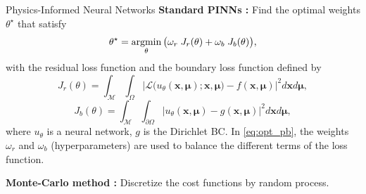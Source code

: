 \begin{frame}{Physics-Informed Neural Networks}
	\textbf{Standard PINNs :} Find the optimal weights $\theta^\star$ that satisfy
	\begin{equation}
		\label{eq:opt_pb}
		\theta^\star = \operatorname*{argmin}_{\theta}	\big( \omega_r \; J_r(\theta) + \omega_b \; J_b(\theta) \big),
	\end{equation}
	with the residual loss function and the boundary loss function defined by
	\begin{equation*}
		J_r(\theta) =
		\int_{\mathcal{M}}\int_{\Omega}
		\big| \mathcal{L}\big(u_\theta(\bm{x},\bm{\mu});\bm{x},\bm{\mu}\big)-f(\bm{x},\bm{\mu}) \big|^2 d\bm{x} d\bm{\mu},
	\end{equation*}
	\begin{equation*}
		J_b(\theta) =
		\int_{\mathcal{M}}\int_{\partial \Omega} \big| u_\theta(\bm{x},\bm{\mu}) - g(\bm{x},\bm{\mu}) \big|^2 d\bm{x} d\bm{\mu},
	\end{equation*}
	where $u_\theta$ is a neural network, $g$ is the Dirichlet BC. In \eqref{eq:opt_pb}, the weights $\omega_r$ and $\omega_b$ (hyperparameters) are used to balance the different terms of the loss function.

	\vspace{5pt}
	\textbf{Monte-Carlo method :} Discretize the cost functions by random process.
\end{frame}

